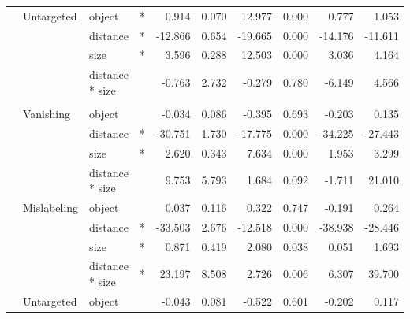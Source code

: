 \begin{longtable}[t]{llllrrrrrr}
\cmidrule{2-10}\nopagebreak
\hspace{1em} & Untargeted & object & * & 0.914 & 0.070 & 12.977 & 0.000 & 0.777 & 1.053\\
\cmidrule{3-10}\nopagebreak
\hspace{1em} &  & distance & * & -12.866 & 0.654 & -19.665 & 0.000 & -14.176 & -11.611\\
\cmidrule{3-10}\nopagebreak
\hspace{1em} &  & size & * & 3.596 & 0.288 & 12.503 & 0.000 & 3.036 & 4.164\\
\cmidrule{3-10}\nopagebreak
\hspace{1em} &  & distance * size &  & -0.763 & 2.732 & -0.279 & 0.780 & -6.149 & 4.566\\
\cmidrule{1-10}\pagebreak[0]
\addlinespace[0.3em]
\multicolumn{10}{l}{\textbf{RetinaNet}}\\
\hspace{1em} & Vanishing & object &  & -0.034 & 0.086 & -0.395 & 0.693 & -0.203 & 0.135\\
\cmidrule{3-10}\nopagebreak
\hspace{1em} &  & distance & * & -30.751 & 1.730 & -17.775 & 0.000 & -34.225 & -27.443\\
\cmidrule{3-10}\nopagebreak
\hspace{1em} &  & size & * & 2.620 & 0.343 & 7.634 & 0.000 & 1.953 & 3.299\\
\cmidrule{3-10}\nopagebreak
\hspace{1em} &  & distance * size &  & 9.753 & 5.793 & 1.684 & 0.092 & -1.711 & 21.010\\
\cmidrule{2-10}\nopagebreak
\hspace{1em} & Mislabeling & object &  & 0.037 & 0.116 & 0.322 & 0.747 & -0.191 & 0.264\\
\cmidrule{3-10}\nopagebreak
\hspace{1em} &  & distance & * & -33.503 & 2.676 & -12.518 & 0.000 & -38.938 & -28.446\\
\cmidrule{3-10}\nopagebreak
\hspace{1em} &  & size & * & 0.871 & 0.419 & 2.080 & 0.038 & 0.051 & 1.693\\
\cmidrule{3-10}\nopagebreak
\hspace{1em} &  & distance * size & * & 23.197 & 8.508 & 2.726 & 0.006 & 6.307 & 39.700\\
\cmidrule{2-10}\nopagebreak
\hspace{1em} & Untargeted & object &  & -0.043 & 0.081 & -0.522 & 0.601 & -0.202 & 0.117\\

\end{longtable}
